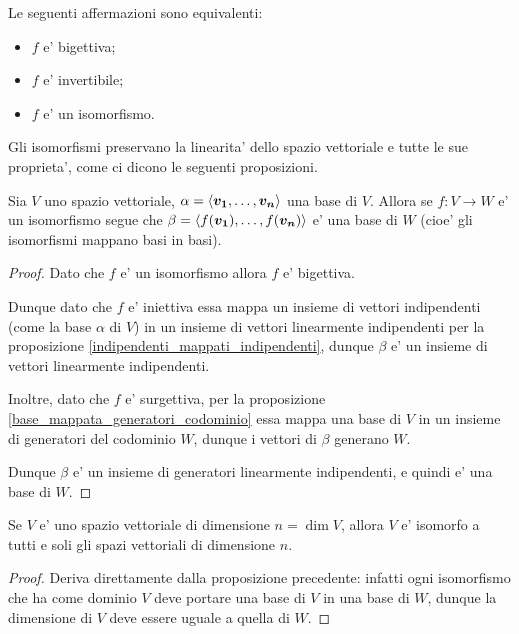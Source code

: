 \begin{remark}
    Le seguenti affermazioni sono equivalenti:
    \begin{itemize}
        \item $f$ e' bigettiva;
        \item $f$ e' invertibile;
        \item $f$ e' un isomorfismo.
    \end{itemize}
\end{remark}

Gli isomorfismi preservano la linearita' dello spazio vettoriale e tutte le sue proprieta', come ci dicono le seguenti proposizioni.

\begin{proposition}
    Sia $V$ uno spazio vettoriale, $\alpha = \left\langle \bm{v_1}, \dots, \bm{v_n} \right\rangle$ una base di $V$. Allora se $f : V \to W$ e' un isomorfismo segue che $\beta = \left\langle f(\bm{v_1}), \dots, f(\bm{v_n}) \right\rangle$ e' una base di $W$ (cioe' gli isomorfismi mappano basi in basi).
\end{proposition}
\begin{proof}
    Dato che $f$ e' un isomorfismo allora $f$ e' bigettiva.

    Dunque dato che $f$ e' iniettiva essa mappa un insieme di vettori indipendenti (come la base $\alpha$ di $V$) in un insieme di vettori linearmente indipendenti per la proposizione \ref{indipendenti_mappati_indipendenti}, dunque $\beta$ e' un insieme di vettori linearmente indipendenti. 

    Inoltre, dato che $f$ e' surgettiva, per la proposizione \ref{base_mappata_generatori_codominio} essa mappa una base di $V$ in un insieme di generatori del codominio $W$, dunque i vettori di $\beta$ generano $W$.

    Dunque $\beta$ e' un insieme di generatori linearmente indipendenti, e quindi e' una base di $W$.
\end{proof}

\begin{proposition}
    Se $V$ e' uno spazio vettoriale di dimensione $n = \dim V$, allora $V$ e' isomorfo a tutti e soli gli spazi vettoriali di dimensione $n$.
\end{proposition}
\begin{proof}
    Deriva direttamente dalla proposizione precedente: infatti ogni isomorfismo che ha come dominio $V$ deve portare una base di $V$ in una base di $W$, dunque la dimensione di $V$ deve essere uguale a quella di $W$.
\end{proof}

